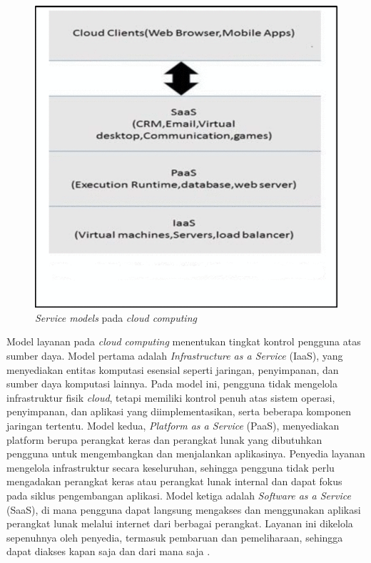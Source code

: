 \newpage

\begin{figure} [H]
    \centering
    \includegraphics[width=0.75\linewidth]{gambar/Cloud Computing Service Models.png}
    \caption{\textit{Service models} pada \textit{cloud computing}}
    \label{figure:Cloud Computing Service Models}
\end{figure}

Model layanan pada \textit{cloud computing} menentukan tingkat kontrol pengguna atas sumber daya. Model pertama adalah \textit{Infrastructure as a Service} (IaaS), yang menyediakan entitas komputasi esensial seperti jaringan, penyimpanan, dan sumber daya komputasi lainnya. Pada model ini, pengguna tidak mengelola infrastruktur fisik \textit{cloud}, tetapi memiliki kontrol penuh atas sistem operasi, penyimpanan, dan aplikasi yang diimplementasikan, serta beberapa komponen jaringan tertentu. Model kedua, \textit{Platform as a Service} (PaaS), menyediakan platform berupa perangkat keras dan perangkat lunak yang dibutuhkan pengguna untuk mengembangkan dan menjalankan aplikasinya. Penyedia layanan mengelola infrastruktur secara keseluruhan, sehingga pengguna tidak perlu mengadakan perangkat keras atau perangkat lunak internal dan dapat fokus pada siklus pengembangan aplikasi. Model ketiga adalah \textit{Software as a Service} (SaaS), di mana pengguna dapat langsung mengakses dan menggunakan aplikasi perangkat lunak melalui internet dari berbagai perangkat. Layanan ini dikelola sepenuhnya oleh penyedia, termasuk pembaruan dan pemeliharaan, sehingga dapat diakses kapan saja dan dari mana saja \parencite{Sakshi2016}.

